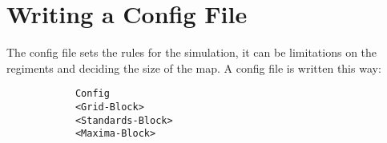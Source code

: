 \section{Writing a Config File}
\label{doc:cfgfile}
	The config file sets the rules for the simulation, it can be limitations on the regiments and deciding the size of the map.
	A config file is written this way: \\
		\begin{verbatim}
			Config
			<Grid-Block>
			<Standards-Block>
			<Maxima-Block>
		\end{verbatim}
	
